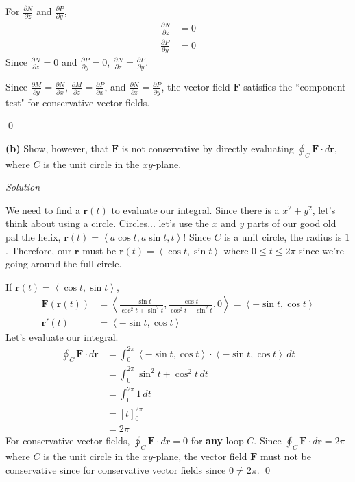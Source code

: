 \documentclass{article}
\newcommand{\lrp}[1]{\left( #1 \right)}
\newcommand{\lra}[1]{\left\langle #1 \right\rangle}
\newcommand{\lrb}[1]{\left[ #1 \right]}
\renewcommand{\r}[0]{\mathbf{r}}
\newcommand{\F}[0]{\mathbf{F}}
\newcommand{\Solution}{\textit{Solution}}
\begin{document}
{}
For $\displaystyle \frac{\partial N}{\partial z}$ and $\displaystyle\frac{\partial P}{\partial y}$,
\begin{align*}
     \frac{\partial N}{\partial z}&=0\\
     \frac{\partial P}{\partial y}&=0
\end{align*}
Since $\displaystyle \frac{\partial N}{\partial z}=0$ and $\displaystyle\frac{\partial P}{\partial y}=0$, $\displaystyle \frac{\partial N}{\partial z}=\frac{\partial P}{\partial y}$.

Since $\displaystyle \frac{\partial M}{\partial y}=\frac{\partial N}{\partial x}$, $\displaystyle \frac{\partial M}{\partial z}=\frac{\partial P}{\partial x}$, and $\displaystyle \frac{\partial N}{\partial z}=\frac{\partial P}{\partial y}$, the vector field $\F$ satisfies the ``component test" for conservative vector fields.

\qed
\newpage
{}
{}\textbf{(b)} Show, however, that $\F$ is not conservative by directly evaluating $\displaystyle \oint_C \F\cdot d\r$, where $C$ is the unit circle in the $xy$-plane.

\Solution

We need to find a $\r(t)$ to evaluate our integral. Since there is a $x^2+y^2$, let's think about using a circle. Circles... let's use the $x$ and $y$ parts of our good old pal the helix, $\r(t)=\lra{a\cos t, a\sin t, t}$! Since $C$ is a unit circle, the radius is $1$. Therefore, our $\r$ must be $\r(t)=\lra{\cos t,\sin t}$ where $0\leq t \leq 2\pi$ since we're going around the full circle.

If $\r(t)=\lra{\cos t,\sin t}$,
\begin{align*}
    \F\lrp{\r(t)}&=\lra{\frac{-\sin t}{\cos^2 t +\sin^2 t},\frac{\cos t}{\cos ^2 t + \sin ^2 t},0}=\lra{-\sin t,\cos t}\tag{$\sin^2 t + \cos ^2 t=1$, we can drop $z$ since $z=0$}\\
    \r'(t)&=\lra{-\sin t, \cos t}
\end{align*}
Let's evaluate our integral.
\begin{align*}
    \oint_C \F\cdot d\r&=\int_0^{2\pi}\lra{-\sin t,\cos t}\cdot \lra{-\sin t, \cos t}\,dt\\
    &=\int_0^{2\pi} \sin^2 t + \cos ^2 t\,dt\\
    &=\int_0^{2\pi} 1\,dt\tag{$\sin^2 t + \cos ^2 t$}\\
    &=\lrb{t}_0^{2\pi}\\
    &=2\pi
\end{align*}
For conservative vector fields, $\displaystyle  \oint_C \F\cdot d\r=0$ for \textbf{any} loop $C$. Since $\displaystyle  \oint_C \F\cdot d\r=2\pi$ where $C$ is the unit circle in the $xy$-plane, the vector field $\F$ must not be conservative since for conservative vector fields since $0\neq 2\pi$.
\qed
\end{document}
